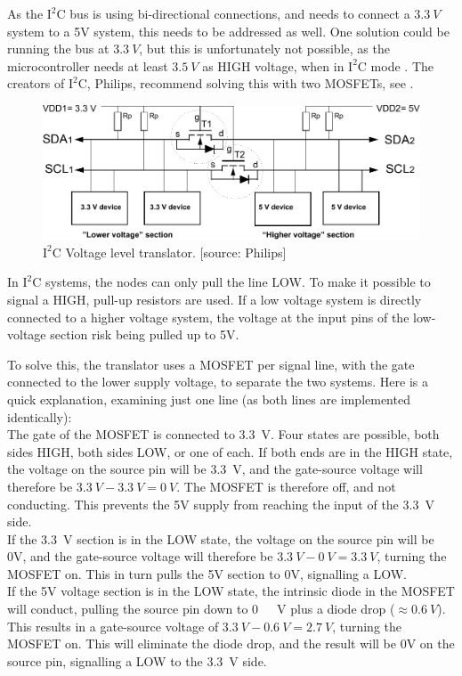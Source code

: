 As the $\text{I}^2\text{C}$ bus is using bi-directional connections, and needs to connect a $\SI{3,3}{V}$ system to a 5V system, this needs to be addressed as well. One solution could be running the bus at $\SI{3,3}{V}$, but this is unfortunately not possible, as the microcontroller needs at least $\SI{3,5}{V}$ as HIGH voltage, when in  $\text{I}^2\text{C}$ mode \cite{Atmega}. The creators of $\text{I}^2\text{C}$, Philips, recommend solving this with two MOSFETs, see .

\begin{figure}[H]
	\centering
	\includegraphics[scale=0.9]{figures/i2cLevel.pdf}
	\caption{$\text{I}^2\text{C}$ Voltage level translator. [source: Philips]}
	\label{i2clevel}
\end{figure}
In $\text{I}^2\text{C}$ systems, the nodes can only pull the line LOW. To make it possible to signal a HIGH, pull-up resistors are used. If a low voltage system is directly connected to a higher voltage system, the voltage at the input pins of the low-voltage section risk being pulled up to 5V.

To solve this, the translator uses a MOSFET per signal line, with the gate connected to the lower supply voltage, to separate the two systems. Here is a quick explanation, examining just one line (as both lines are implemented identically):\\
%
The gate of the MOSFET is connected to \SI{3,3}{V}.
Four states are possible, both sides HIGH, both sides LOW, or one of each.
If both ends are in the HIGH state, the voltage on the source pin will be \SI{3,3}{V}, and the gate-source voltage will therefore be $\SI{3,3}{V}-\SI{3,3}{V}=\SI{0}{V}$. The MOSFET is therefore off, and not conducting. This prevents the 5V supply from reaching the input of the \SI{3,3}{V} side.\\
If the \SI{3,3}{V} section is in the LOW state, the voltage on the source pin will be 0V, and the gate-source voltage will therefore be $\SI{3,3}{V}-\SI{0}{V}=\SI{3,3}{V}$, turning the MOSFET on. This in turn pulls the 5V section to 0V, signalling a LOW.\\
If the 5V voltage section is in the LOW state, the intrinsic diode in the MOSFET will conduct, pulling the source pin down to \si{0\ V} plus a diode drop ($\approx\SI{0,6}{V}$). This results in a gate-source voltage of $\SI{3,3}{V}-\SI{0,6}{V}=\SI{2,7}{V}$, turning the MOSFET on. This will eliminate the diode drop, and the result will be 0V on the source pin, signalling a LOW to the \SI{3,3}{V} side.

